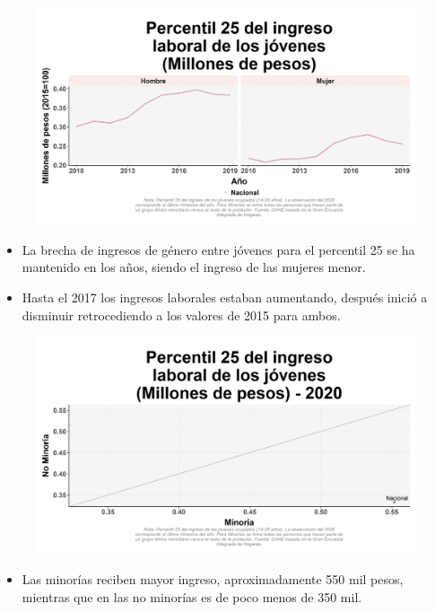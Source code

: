     \begin{figure}[H]
        \caption[Percentil 25 del ingreso laboral de los jóvenes por género ]{\label{inglab25jov_gen_trend} }
        \begin{center}
        \includegraphics[width=\textwidth,keepaspectratio]{img/var_12_trend.png}
        \end{center}
    \end{figure}
            \begin{itemize}
                \item La brecha de ingresos de género entre jóvenes para el percentil 25 se ha mantenido en los años, siendo el ingreso de las mujeres menor.
                \item Hasta el 2017 los ingresos laborales estaban aumentando, después inició a disminuir retrocediendo a los valores de 2015 para ambos.
                \end{itemize}

    \begin{figure}[H]
        \caption[Percentil 25 del ingreso laboral de los jóvenes por minorías y no minorías para 2020 ]{\label{inglab25jov_minoria_scatter} }
        \begin{center}
        \includegraphics[width=\textwidth,keepaspectratio]{img/var_11_scatter.png}
        \end{center}
    \end{figure}
            \begin{itemize}
                \item Las minorías reciben mayor ingreso, aproximadamente 550 mil pesos, mientras que en las no minorías es de poco menos de 350 mil.
                \end{itemize}

